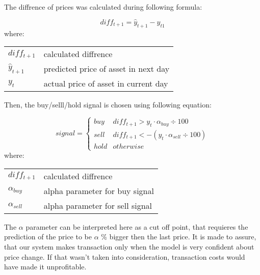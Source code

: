 \documentclass[11pt]{article} %
\makeatletter
\newenvironment{conditions}
  {\par\vspace{\abovedisplayskip}\noindent\begin{tabular}{>{$}l<{$} @{${}={}$} l}}
  {\end{tabular}\par\vspace{\belowdisplayskip}}
\makeatother
\begin{document}
The diffrence of prices was calculated during following formula:

\begin{equation}  diff_{t+1} = \hat{y}_{t+1} - y_{t1} \end{equation}
where:
\begin{conditions}
diff_{t+1} & calculated diffrence \\ 
 \hat{y}_{t+1}     &   predicted price of asset in next day\\
 y_{t}     &  actual price of asset in current day\\   
\end{conditions}

 \begin{flushleft} Then, the buy/selll/hold signal is chosen using following equation: \end{flushleft} 
\begin{equation}
signal =  \left\{\begin{array}{ll} buy & diff_{t+1} >  y_{t} \cdot  \alpha_{buy} \div 100 \\ sell & diff_{t+1} <  -(y_{t} \cdot  \alpha_{sell} \div 100)\\  hold & otherwise \end{array}\right.
\end{equation}
where:
\begin{conditions}
diff_{t+1} & calculated diffrence \\ 
\alpha_{buy}     &  alpha parameter for buy signal \\   
\alpha_{sell}     &  alpha parameter for sell signal\\   
\end{conditions}

The $\alpha$ parameter can be interpreted here as a cut off point, that requieres the prediction of the price to be $\alpha $ \% bigger then the last price. It is made to assure, that our system makes transaction only when the model is very confident about price change. 
If that wasn't  taken into consideration, transaction costs would have made it unprofitable. 
\end{document}

